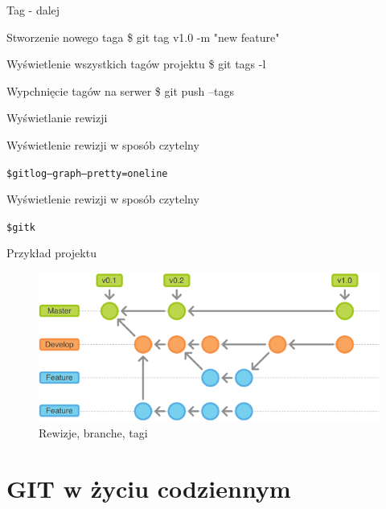\documentclass{beamer}
\begin{document}
\begin{frame}{Tag - dalej}
\begin{block}{Stworzenie nowego taga}
\$ git tag v1.0 -m "new feature"
\end{block}
\vskip 0.5cm
\begin{block}{Wyświetlenie wszystkich tagów projektu}
\$ git tags -l
\end{block}
\begin{block}{Wypchnięcie tagów na serwer}
\$ git push --tags
\end{block}
\end{frame}

\begin{frame}{Wyświetlanie rewizji}
\begin{block}{Wyświetlenie rewizji w sposób czytelny}
\begin{alltt}
\$ git log --graph --pretty=oneline \\
\end{alltt}
\end{block}

\begin{block}{Wyświetlenie rewizji w sposób czytelny}
\begin{alltt}
    \$ gitk
\end{alltt}
\end{block}
\end{frame}

\begin{frame}{Przykład projektu}
  \begin{figure}
  \includegraphics[width=\textwidth]{photos/revisions_and_branches_and_tags.png}
  \caption{\label{Branches}Rewizje, branche, tagi}
  \end{figure}
\end{frame}


\section{GIT w życiu codziennym}
\end{document}
